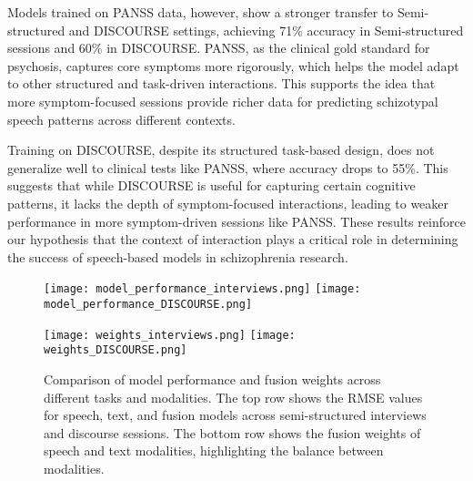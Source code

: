 \documentclass[9pt,a4paper]{rho-class/rho}
\begin{document}
Models trained on PANSS data, however, show a stronger transfer to Semi-structured and DISCOURSE settings, achieving 71\% accuracy in Semi-structured sessions and 60\% in DISCOURSE. PANSS, as the clinical gold standard for psychosis, captures core symptoms more rigorously, which helps the model adapt to other structured and task-driven interactions. This supports the idea that more symptom-focused sessions provide richer data for predicting schizotypal speech patterns across different contexts.

Training on DISCOURSE, despite its structured task-based design, does not generalize well to clinical tests like PANSS, where accuracy drops to 55\%. This suggests that while DISCOURSE is useful for capturing certain cognitive patterns, it lacks the depth of symptom-focused interactions, leading to weaker performance in more symptom-driven sessions like PANSS. These results reinforce our hypothesis that the context of interaction plays a critical role in determining the success of speech-based models in schizophrenia research.


\begin{figure*}[htp]
    \centering
    \texttt{[image: model\_performance\_interviews.png]}
    \hfill
    \texttt{[image: model\_performance\_DISCOURSE.png]}

    \vspace{-0.8em} %

    \texttt{[image: weights\_interviews.png]}
    \hfill
    \texttt{[image: weights\_DISCOURSE.png]}

    \caption{Comparison of model performance and fusion weights across different tasks and modalities. The top row shows the RMSE values for speech, text, and fusion models across semi-structured interviews and discourse sessions. The bottom row shows the fusion weights of speech and text modalities, highlighting the balance between modalities.}
    \label{fig:model_performance_weights}
\end{figure*}
\end{document}
